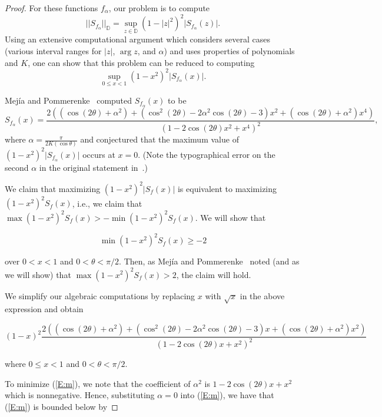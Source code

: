 \documentclass{lms}
\newcommand{\D}{\mathbb D}
\newcommand{\abs}[1]{\lvert#1\rvert}
\newcommand{\norm}[1]{\lvert\lvert#1\rvert\rvert}
\numberwithin{equation}{section}
\begin{document}
\begin{proof}
For these functions $f_\alpha$, our problem is to compute
\[
\norm{S_{f_\alpha}}_\D = \sup_{z\in\D} \left(1 - \abs{z}^2\right)^2 
\abs{S_{f_\alpha}(z)}.
\]
Using an extensive computational argument which considers several cases
(various interval ranges for $\abs{z}$, $\arg z$, and $\alpha$) and
uses properties of polynomials and $K$, one can show that this 
problem can be reduced to computing
\[
\sup_{0\leq x<1}\left(1-x^2\right)^2 \abs{S_{f_\alpha}(x)}.
\]



Mej\'ia and Pommerenke~\cite{PM00} computed $S_{f_\alpha}(x)$ to be
\[
S_{f_\alpha}(x)=\frac{2( (\cos(2\theta)+\alpha^2) 
+ (\cos^2(2\theta)-2\alpha^2\cos(2 \theta) -3)x^2 
+ (\cos(2\theta) +\alpha^2)x^4)}{(1-2\cos(2\theta)x^2 +x^4)^2},
\]
where $\alpha=\frac{\pi}{2K(\cos\theta)}$ and conjectured that the maximum value 
of $(1-x^2)^2 \abs{S_{f_\alpha}(x)}$ occurs
at $x=0$.
(Note the typographical error on the second $\alpha$ in the original 
statement in~\cite{PM00}.)


We claim that maximizing $(1-x^2)^2 \abs{S_f(x)}$ 
is equivalent to maximizing $(1-x^2)^2 {S_f(x)}$, i.e., we claim that
$\max (1-x^2)^2 {S_f(x)} > -\min (1-x^2)^2 {S_f(x)}$.  We will show that

\begin{equation} \label{claim_min}
\min (1-x^2)^2 {S_f(x)} \ge -2
\end{equation}

\vspace{0.1in}

\noindent over $ 0 < x < 1$ and $0<\theta<\pi/2$. 
Then, as Mej\'ia and Pommerenke~\cite{PM00} noted (and as we will show)
that $\max (1-x^2)^2 {S_f(x)} > 2$, the claim will hold.  

We simplify our algebraic computations
by replacing $x$ with $\sqrt{x}$ in the above expression and obtain

\begin{equation} \label{E:m}
(1-x)^{2} \frac{2( (\cos(2\theta)+\alpha^2) 
+ (\cos^2(2\theta)-2\alpha^2\cos(2 \theta) -3)x 
+ (\cos(2\theta) +\alpha^2)x^2)}{(1-2\cos(2\theta)x +x^2)^2}
\end{equation}

\noindent where $ 0 \le x < 1$ and $0<\theta<\pi/2$.

To minimize (\ref{E:m}), we note that the coefficient of $\alpha^2$ is $1-2\cos(2\theta)x +x^2$ which
is nonnegative.  Hence, substituting $\alpha=0$ into (\ref{E:m}), we have that (\ref{E:m}) is bounded below by


\end{proof}
\end{document}
